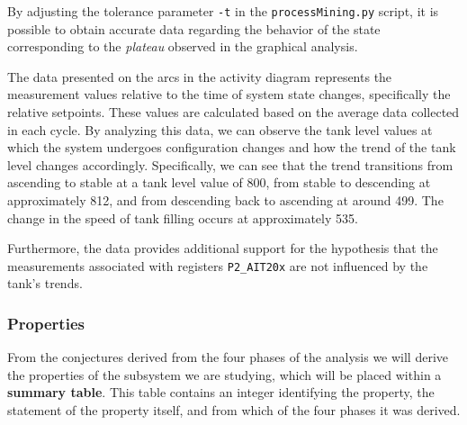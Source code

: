 By adjusting the tolerance parameter \texttt{-t} in the \texttt{processMining.py} script, it is possible to obtain accurate data regarding the behavior of the state corresponding to the \textit{plateau} observed in the graphical analysis.

\bigskip
The data presented on the arcs in the activity diagram represents the measurement values relative to the time of system state changes, specifically the relative setpoints. These values are calculated based on the average data collected in each cycle. By analyzing this data, we can observe the tank level values at which the system undergoes configuration changes and how the trend of the tank level changes accordingly. Specifically, we can see that the trend transitions from ascending to stable at a tank level value of 800, from stable to descending at approximately 812, and from descending back to ascending at around 499. The change in the speed of tank filling occurs at approximately 535.

\bigskip
Furthermore, the data provides additional support for the hypothesis that the measurements associated with registers \texttt{P2\_AIT20x} are not influenced by the tank's trends.

\subsubsection{Properties}
\label{subsubsec:6_P1P2_summary_table}
From the conjectures derived from the four phases of the analysis we will derive the properties of the subsystem we are studying, which will be placed within a \textbf{summary table}. This table contains an integer identifying the property, the statement of the property itself, and from which of the four phases it was derived.

